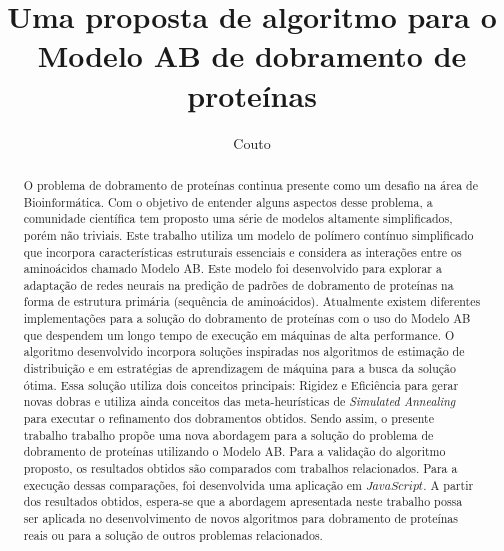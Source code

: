 \documentclass[dm,ppgcomp]{texfurg}
\title{Uma proposta de algoritmo para o Modelo AB de dobramento de proteínas}
\author{Couto}{Rafael Castro do}
\begin{document}
\maketitle

\begin{abstract}

O problema de dobramento de proteínas continua presente como um desafio na área de Bioinformática. Com o objetivo de entender alguns aspectos desse problema, a comunidade científica tem proposto uma série de modelos altamente simplificados, porém não triviais. 
Este trabalho utiliza um modelo de polímero contínuo simplificado que incorpora características estruturais essenciais e considera as interações entre os aminoácidos chamado Modelo AB. Este modelo foi desenvolvido para explorar a adaptação de redes neurais na predição de padrões de dobramento de proteínas na forma de estrutura primária (sequência de aminoácidos). Atualmente existem diferentes implementações para a solução do dobramento de proteínas com o uso do Modelo AB que despendem um longo tempo de execução em máquinas de alta performance. 
O algoritmo desenvolvido incorpora soluções inspiradas nos algoritmos de estimação de distribuição e em estratégias de aprendizagem de máquina para a busca da solução ótima. Essa solução utiliza dois conceitos principais: Rigidez e Eficiência para gerar novas dobras e utiliza ainda conceitos das meta-heurísticas de {\it Simulated Annealing} para executar o refinamento dos dobramentos obtidos.
Sendo assim, o presente trabalho trabalho propõe uma nova abordagem para a solução do problema de dobramento de proteínas utilizando o Modelo AB. Para a validação do algoritmo proposto, os resultados obtidos são comparados com trabalhos relacionados. Para a execução dessas comparações, foi desenvolvida uma aplicação em $JavaScript$. A partir dos resultados obtidos, espera-se que a abordagem apresentada neste trabalho possa ser aplicada no desenvolvimento de novos algoritmos para dobramento de proteínas reais ou para a solução de outros problemas relacionados. 

\end{abstract}
\end{document}
